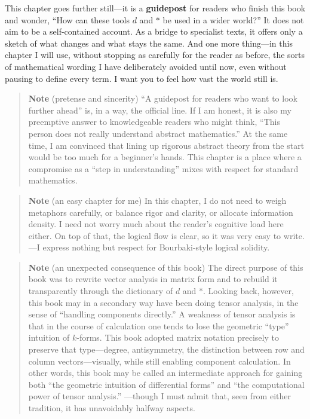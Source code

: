 This chapter goes further still---it is a \textbf{guidepost} for readers
who finish this book and wonder, ``How can these tools \(d\) and
\(\ast\) be used in a wider world?'' It does not aim to be a
self-contained account. As a bridge to specialist texts, it offers only
a sketch of what changes and what stays the same. And one more
thing---in this chapter I will use, without stopping as carefully for
the reader as before, the sorts of mathematical wording I have
deliberately avoided until now, even without pausing to define every
term. I want you to feel how vast the world still is.

\begin{quote}
\textbf{Note} (pretense and sincerity) ``A guidepost for readers who
want to look further ahead'' is, in a way, the official line. If I am
honest, it is also my preemptive answer to knowledgeable readers who
might think, ``This person does not really understand abstract
mathematics.'' At the same time, I am convinced that lining up rigorous
abstract theory from the start would be too much for a beginner's hands.
This chapter is a place where a compromise as a ``step in
understanding'' mixes with respect for standard mathematics.
\end{quote}

\begin{quote}
\textbf{Note} (an easy chapter for me) In this chapter, I do not need to
weigh metaphors carefully, or balance rigor and clarity, or allocate
information density. I need not worry much about the reader's cognitive
load here either. On top of that, the logical flow is clear, so it was
very easy to write. ---I express nothing but respect for Bourbaki-style
logical solidity.
\end{quote}

\begin{quote}
\textbf{Note} (an unexpected consequence of this book) The direct
purpose of this book was to rewrite vector analysis in matrix form and
to rebuild it transparently through the dictionary of \(d\) and
\(\ast\). Looking back, however, this book may in a secondary way have
been doing tensor analysis, in the sense of ``handling components
directly.'' A weakness of tensor analysis is that in the course of
calculation one tends to lose the geometric ``type'' intuition of
\(k\)-forms. This book adopted matrix notation precisely to preserve
that type---degree, antisymmetry, the distinction between row and column
vectors---visually, while still enabling component calculation. In other
words, this book may be called an intermediate approach for gaining both
``the geometric intuition of differential forms'' and ``the
computational power of tensor analysis.'' ---though I must admit that,
seen from either tradition, it has unavoidably halfway aspects.
\end{quote}

